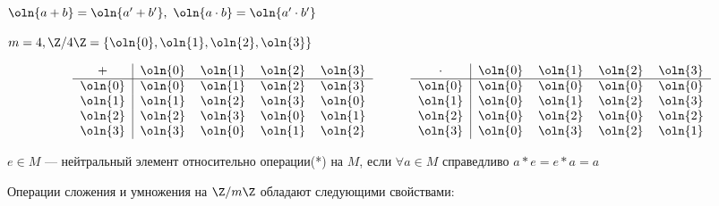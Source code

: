 $\oln{a + b} = \oln{a' + b'},~\oln{a \cdot b} = \oln{a' \cdot b'}$

\begin{example}
    $m = 4, \Z/4\Z = \{\oln{0}, \oln{1}, \oln{2}, \oln{3}\}$
\end{example}

\[
\begin{tabular}{c|cccc}
    $+$ & $\oln{0}$ & $\oln{1}$ & $\oln{2}$ & $\oln{3}$\\
    \hline
    $\oln{0}$ & $\oln{0}$ & $\oln{1}$ & $\oln{2}$ & $\oln{3}$\\
    $\oln{1}$ & $\oln{1}$ & $\oln{2}$ & $\oln{3}$ & $\oln{0}$\\
    $\oln{2}$ & $\oln{2}$ & $\oln{3}$ & $\oln{0}$ & $\oln{1}$\\
    $\oln{3}$ & $\oln{3}$ & $\oln{0}$ & $\oln{1}$ & $\oln{2}$
\end{tabular}
\quad\quad\quad
\begin{tabular}{c|cccc}
    $\cdot$ & $\oln{0}$ & $\oln{1}$ & $\oln{2}$ & $\oln{3}$\\
    \hline
    $\oln{0}$ & $\oln{0}$ & $\oln{0}$ & $\oln{0}$ & $\oln{0}$\\
    $\oln{1}$ & $\oln{0}$ & $\oln{1}$ & $\oln{2}$ & $\oln{3}$\\
    $\oln{2}$ & $\oln{0}$ & $\oln{2}$ & $\oln{0}$ & $\oln{2}$\\
    $\oln{3}$ & $\oln{0}$ & $\oln{3}$ & $\oln{2}$ & $\oln{1}$
\end{tabular}
\]

\begin{defn}
    $e \in M$ --- нейтральный элемент относительно операции(*) на $M$, если $\forall a \in M$ справедливо $a * e = e * a = a$
\end{defn}

\begin{theorem-non}
    Операции сложения и умножения на $\Z/m\Z$ обладают следующими свойствами:
\end{theorem-non}

